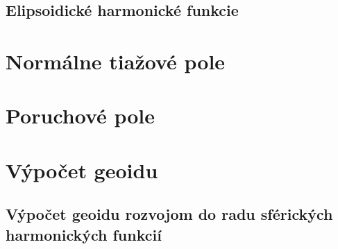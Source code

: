 \documentclass[a4paper, 12pt]{book}
\begin{document}

\section{Elipsoidické harmonické funkcie}








\chapter{Normálne tiažové pole}








\chapter{Poruchové pole}








\chapter{Výpočet geoidu}







\section{Výpočet geoidu rozvojom do radu sférických harmonických funkcií}
\end{document}

